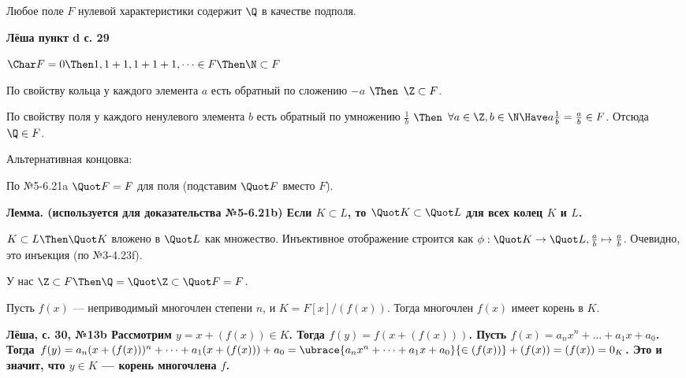 \begin{problem}
Любое поле $F$ нулевой характеристики содержит $\Q$ в качестве подполя.
\end{problem}
\begin{solution}
\bf{Лёша пункт d с. 29}

$\Char F = 0 \Then 1, 1+1, 1+1+1, \dots \in F \Then \N \subset F$

По свойству кольца у каждого элемента $a$ есть обратный по сложению $-a$ $\Then$ $\Z \subset F$.

По свойству поля у каждого ненулевого элемента $b$ есть обратный по умножению $\frac{1}{b}$ $\Then$ $\forall a\in \Z, b \in \N \Have a \frac{1}{b} = \frac{a}{b} \in F$. Отсюда $\Q \in F$.





Альтернативная концовка:

По №5-6.21a \(\Quot F=F\) для поля (подставим $\Quot F$ вместо $F$).

\bf{Лемма.} (используется для доказательства №5-6.21b) Если \(K \subset L\), то \(\Quot K \subset \Quot L\) для всех колец $K$ и $L$.
\begin{solution}
$K \subset L\Then \Quot K$ вложено в $\Quot L$ как множество. Инъективное отображение строится как $\phi: \Quot K \to \Quot L, \frac{a}{b} \mapsto \frac{a}{b}$. Очевидно, это инъекция (по №3-4.23f).
\end{solution}

У нас \(\Z \subset F \Then \Q=\Quot\Z\subset\Quot F=F\).

\end{solution}

\begin{problem}
Пусть $f(x)$ --- неприводимый многочлен степени $n$, и $K = F[x]/(f(x))$. Тогда многочлен $f(x)$ имеет корень в $K$.
\end{problem}

\begin{solution}
\bf{Лёша, с. 30, №13b}
Рассмотрим $y = x+(f(x)) \in K$. Тогда $f(y) = f(x+(f(x)))$. Пусть $f(x) = a_nx^n+\dots+a_1x+a_0$. Тогда $f(y) = a_n(x+(f(x)))^n+\dots+a_1(x+(f(x)))+a_0 = \ubrace{a_nx^n+\dots+a_1x+a_0}{\in (f(x))}+(f(x)) = (f(x)) = 0_K$. Это и значит, что $y \in K$ --- корень многочлена $f$.
\end{solution}

